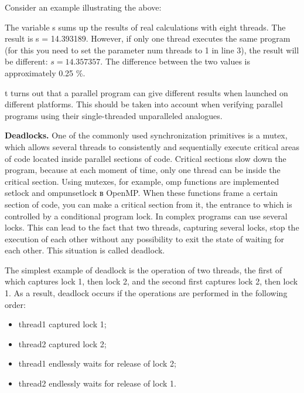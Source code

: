 {	\par Consider an example illustrating the above:
	\begin{figure}[H]
		
	\end{figure}
	\par The variable s sums up the results of real calculations with eight threads. The result is s = 14.393189. However, if only one thread executes the same program (for this you need to set the parameter num \textunderscore threads to 1 in line 3), the result will be different: $s=14.357357$. The difference between the two values is approximately 0.25 \%.
	\par t turns out that a parallel program can give different results when launched on different platforms. This should be taken into account when verifying parallel programs using their single-threaded unparalleled analogues.
	\par\textbf{Deadlocks.} One of the commonly used synchronization primitives is a mutex, which allows several threads to consistently and sequentially execute critical areas of code located inside parallel sections of code. Critical sections slow down the program, because at each moment of time, only one thread can be inside the critical section. Using mutexes, for example, omp functions are implemented \textunderscore set\textunderscore lock and omp\textunderscore unset\textunderscore lock в OpenMP. When these functions frame a certain section of code, you can make a critical section from it, the entrance to which is controlled by a conditional program lock. In complex programs can use several locks. This can lead to the fact that two threads, capturing several locks, stop the execution of each other without any possibility to exit the state of waiting for each other. This situation is called deadlock.
	\par The simplest example of deadlock is the operation of two threads, the first of which captures lock 1, then lock 2, and the second first captures lock 2, then lock 1. As a result, deadlock occurs if the operations are performed in the following order:
	\begin{itemize}
\item thread1 captured lock 1;
\item thread2 captured lock 2;
\item thread1 endlessly waits for release of lock 2;
\item thread2 endlessly waits for release of lock 1.
	\end{itemize}
}
